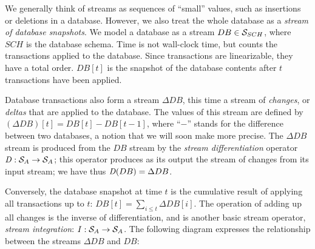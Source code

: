\begin{center}
\vspace{-.2cm}
\end{center}

We generally think of streams as sequences of ``small'' values,
such as insertions or deletions in a database.
However, we also treat the whole database as a \emph{stream of database
snapshots}.  We model a database as a
stream $DB \in \mathcal{S}_{SCH}$, where $SCH$ is the database schema.
Time is not wall-clock time, but counts
the transactions applied to the database. 
Since transactions are linearizable, they have a total order.
$DB[t]$ is the snapshot of the 
database contents after $t$ transactions have been applied.  

Database transactions also form a stream $\Delta DB$, this time a stream of \emph{changes},
or \emph{deltas} that are applied to the database.  The values of
this stream are defined by $(\Delta DB)[t] = DB[t] - DB[t-1]$, where ``$-$'' stands 
for the difference between two databases, a notion that we will soon make more precise.  
The $\Delta DB$ stream is produced from the $DB$ stream by 
the \emph{stream differentiation} operator $\mathit{D} : \mathcal{S}_{A} \to \mathcal{S}_{A}$;
this operator produces as its output the stream of changes from its input stream; 
we have thus $\mathit{D}(DB) = \Delta DB$.

Conversely, the database snapshot at time $t$ is the cumulative result of applying all 
transactions up to $t$: $DB[t] = \sum_{i \leq t} \Delta DB[i]$.
The operation of adding up all changes is the inverse of differentiation,
and is another basic stream operator, \emph{stream integration}: $\mathit{I}: \mathcal{S}_{A} \to \mathcal{S}_{A}$.
The following diagram expresses the relationship between the streams $\Delta DB$ and $DB$: 

\begin{center}
\end{center}


